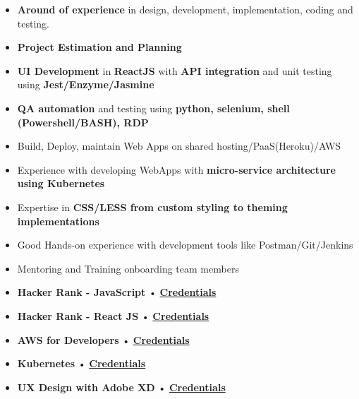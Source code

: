 \begin{itemize}
\item \textbf{Around  of experience} in design, development, implementation, coding and testing.
\item \textbf{Project Estimation and Planning}
\item \textbf{UI Development} in \textbf{ReactJS} with \textbf{API integration} and unit testing using \textbf{Jest/Enzyme/Jasmine}
\item \textbf{QA automation} and testing using \textbf{python, selenium, shell (Powershell/BASH), RDP}
\item Build, Deploy, maintain Web Apps on shared hosting/PaaS(Heroku)/AWS
\item Experience with developing WebApps with \textbf{micro-service architecture using Kubernetes}
\item Expertise in \textbf{CSS/LESS from custom styling to theming implementations}
\item Good Hands-on experience with development tools like Postman/Git/Jenkins
\item Mentoring and Training onboarding team members
\end{itemize}

\smallskip
\begin{itemize}
\item \textbf{Hacker Rank - JavaScript} { • } \href{https://www.hackerrank.com/certificates/9e1b72fa37a2}{\textbf{Credentials}}
\newline
\smallskip

\item \textbf{Hacker Rank - React JS} { • } \href{https://www.hackerrank.com/certificates/6f620b44da51}{\textbf{Credentials}}
\newline
\smallskip

\item \textbf{AWS for Developers} { • } \href{https://www.dropbox.com/s/8a2mixx1nuaw0z9/CertificateOfCompletion_Learning%20Amazon%20Web%20Services%20AWS%20for%20Developers.pdf?dl=0}{\textbf{Credentials}}
\newline
\smallskip

\item \textbf{Kubernetes} { • } \href{https://www.dropbox.com/s/a0usxfusqvmeg82/CertificateOfCompletion_Learning%20Kubernetes.pdf?dl=0}{\textbf{Credentials}}
\newline
\smallskip

\item \textbf{UX Design with Adobe XD} { • } \href{https://www.udemy.com/certificate/UC-8155e0cf-c816-4172-9a82-1516f26752f1/}{\textbf{Credentials}}
\newline
\smallskip
\end{itemize}


